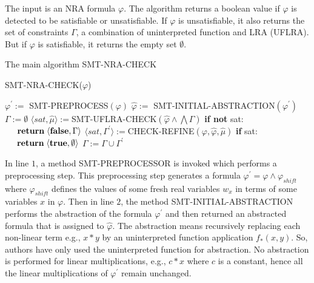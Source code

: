 \noindent The input is an NRA formula $\varphi$.
The algorithm returns a boolean value if $\varphi$ is detected to be satisfiable or unsatisfiable.
If $\varphi$ is unsatisfiable, it also returns the set of constraints $\Gamma$, a combination of uninterpreted function and LRA (UFLRA).
But if $\varphi$ is satisfiable, it returns the empty set $\emptyset$.\newline

\begin{algorithm}
\caption{The main algorithm SMT-NRA-CHECK \cite{Cimatti:2018:ILS:3274693.3230639}} 
\label{alg:IL_For_SMT}
SMT-NRA-CHECK($\varphi$)
\begin{algorithmic}[1]
\State $\varphi^\prime :=$ SMT-PREPROCESS$(\varphi)$
\State $\hat{\varphi} :=$ SMT-INITIAL-ABSTRACTION$(\varphi^\prime)$
\State $\Gamma := \emptyset$
\State $\langle sat, \hat{\mu} \rangle := $SMT-UFLRA-CHECK$(\hat{\varphi} \wedge \bigwedge \Gamma)$
\State \textbf{if not} sat:
\State $\hspace{5mm} \textbf{return} \hspace{1mm}\langle \textbf{false}, \Gamma \rangle$
\State $\langle sat, \Gamma^\prime \rangle := $CHECK-REFINE$(\varphi, \hat{\varphi}, \hat{\mu})$
\State \textbf{if} sat:
\State $\hspace{5mm} \textbf{return} \hspace{1mm}\langle \textbf{true}, \emptyset \rangle$
\State $\Gamma := \Gamma \cup \Gamma^\prime$
\EndWhile
\end{algorithmic}
\end{algorithm}

\noindent In line $1$, a method SMT-PREPROCESSOR is invoked which performs a preprocessing step.
This preprocessing step generates  a formula $\varphi^{\prime} = \varphi \wedge \varphi_{shift}$ where $\varphi_{shift}$ defines the values of some fresh real variables $w_{x}$ in terms of some variables $x$ in $\varphi$.
Then in line $2$, the method SMT-INITIAL-ABSTRACTION performs the abstraction of the formula $\varphi^{\prime}$ and then returned an abstracted formula that is assigned to $\hat{\varphi}$.
The abstraction means recursively replacing each non-linear term e.g., $x \ast y$ by an uninterpreted function application $f_{\ast}(x, y)$.
So, authors have only used the uninterpreted function for abstraction.
No abstraction is performed for linear multiplications, e.g., $c \ast x$ where $c$ is a constant, hence all the linear multiplications of $\varphi^{\prime}$ remain unchanged.\newline


